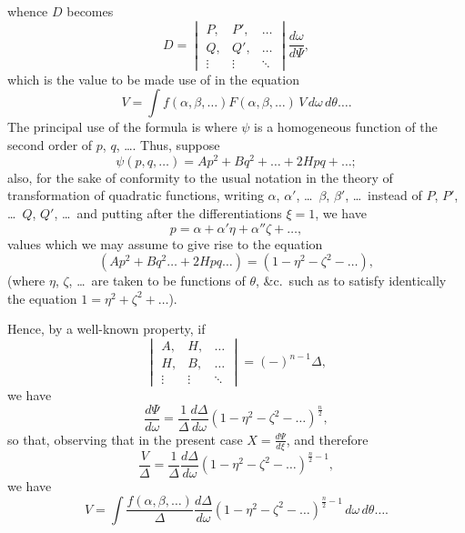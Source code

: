 \documentclass[11pt,a4paper]{article}
\theoremstyle{definition}
\begin{document}
\newpage

\setcounter{page}{441}

whence $D$ becomes
\[
D = \begin{vmatrix}
P, & P', & \ldots \\
Q, & Q', & \ldots \\
\vdots & \vdots & \ddots
\end{vmatrix}
\frac{d\omega}{d\Psi},
\]
which is the value to be made use of in the equation
\[
V = \int f(\alpha, \beta, \ldots)F(\alpha, \beta, \ldots)\, V\, d\omega\, d\theta\ldots.
\]
The principal use of the formula is where $\psi$ is a homogeneous function of the second order of $p$, $q$, \ldots. Thus, suppose
\[
\psi(p, q, \ldots) = Ap^{2} + Bq^{2} + \ldots + 2Hpq + \ldots;
\]
also, for the sake of conformity to the usual notation in the theory of transformation of quadratic functions, writing $\alpha$, $\alpha'$, \ldots\ $\beta$, $\beta'$, \ldots\ instead of $P$, $P'$, \ldots\ $Q$, $Q'$, \ldots\ and putting after the differentiations $\xi = 1$, we have
\[
p = \alpha + \alpha'\eta + \alpha''\zeta + \ldots,
\]
values which we may assume to give rise to the equation
\[
(Ap^{2} + Bq^{2} \ldots + 2Hpq \ldots) = (1 - \eta^{2} - \zeta^{2} - \ldots),
\]
(where $\eta$, $\zeta$, \ldots\ are taken to be functions of $\theta$, \&c.\ such as to satisfy identically the equation $1 = \eta^{2} + \zeta^{2} + \ldots$).

Hence, by a well-known property, if
\[
\begin{vmatrix}
A, & H, & \ldots \\
H, & B, & \ldots \\
\vdots & \vdots & \ddots
\end{vmatrix}
= (-)^{n-1}\Delta,
\]
we have
\[
\frac{d\Psi}{d\omega} = \frac{1}{\Delta}\frac{d\Delta}{d\omega}(1 - \eta^{2} - \zeta^{2} - \ldots)^{\frac{n}{2}},
\]
so that, observing that in the present case $X = \frac{d\Psi}{d\xi}$, and therefore
\[
\frac{V}{\Delta} = \frac{1}{\Delta}\frac{d\Delta}{d\omega}(1 - \eta^{2} - \zeta^{2} - \ldots)^{\frac{n}{2}-1},
\]
we have
\[
V = \int \frac{f(\alpha, \beta, \ldots)}{\Delta}\frac{d\Delta}{d\omega}(1 - \eta^{2} - \zeta^{2} - \ldots)^{\frac{n}{2}-1}\, d\omega\, d\theta\ldots.
\]

\newpage

\setcounter{page}{442}
\end{document}
